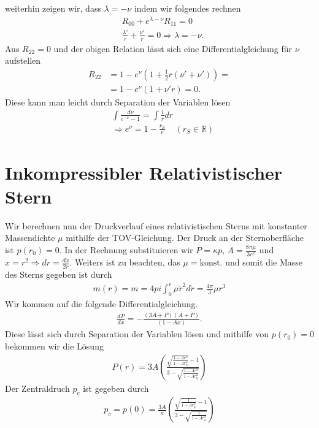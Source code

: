 \documentclass[a4paper]{article}
\begin{document}
weiterhin zeigen wir, dass $\lambda = -\nu$ indem wir folgendes rechnen
\begin{align}
    &R_{00} + e^{\lambda-\nu} R_11 = 0\\
    &\frac{\lambda'}{r} + \frac{\nu'}{r} = 0 \Rightarrow \lambda = -\nu.
\end{align}
Aus $R_{22} = 0$ und der obigen Relation lässt sich eine
Differentialgleichung für $\nu$ aufstellen
\begin{align}
    R_{22} &= 1 - e^\nu (1 + \frac{1}{2}r(\nu'+ \nu')) = \\
    &= 1 - e^\nu (1+ \nu' r) = 0.
\end{align}
Diese kann man leicht durch Separation der Variablen lösen
\begin{align}
    &\int \frac{d\nu}{e^{-\nu} -1} = \int \frac{1}{r} dr\\
    &\Rightarrow e^\nu = 1-\frac{r_S}{r} \;\;\;\; (r_S\in \mathbb{R})
\end{align}
\section{Inkompressibler Relativistischer Stern}
Wir berechnen nun der Druckverlauf eines relativistischen Sterns mit
konstanter Massendichte $\mu$ mithilfe der TOV-Gleichung. Der Druck an der
Sternoberfläche ist $p(r_0) =0$. In der Rechnung substituieren wir
$P = \kappa p$, $A = \frac{8\pi\mu}{3c^2}$ und
$x=r^2 \Rightarrow dr= \frac{dx}{2r}$. Weiters ist zu
beachten, das $\mu = \text{konst.}$ und somit
die Masse des Sterns gegeben ist durch
\begin{align}
    m(r) = m = 4pi \int_0^r \mu \tilde{r}^2 d\tilde{r} =\frac{4\pi}{3}\mu r^3
\end{align}
Wir kommen auf die folgende Differentialgleichung.
\begin{align}
    \frac{dP}{dx} = -\frac{(3A+P)(A+P)}{(1-Ax)}.
\end{align}
Diese lässt sich durch Separation der Variablen lösen und mithilfe von
$p(r_0) = 0$ bekommen wir die Lösung
\begin{align}
    P(r) = 3A\left( \frac{\sqrt{\frac{1-Ar^2}{1-Ar_0^2}} -
    1}{3-\sqrt{\frac{1-Ar^2}{1-Ar_0^2}}}\right)
\end{align}
Der Zentraldruch $p_c$ ist gegeben durch
\begin{align}
    p_c = p(0) = \frac{3A}{\kappa}\left( \frac{\sqrt{\frac{1}{1-Ar_0^2}} -
    1}{3-\sqrt{\frac{1}{1-Ar_0^2}}}\right)

\end{align}







\nocite{meinel}
\nocite{piotr}
\nocite{oloff}
\printbibliography
\end{document}

